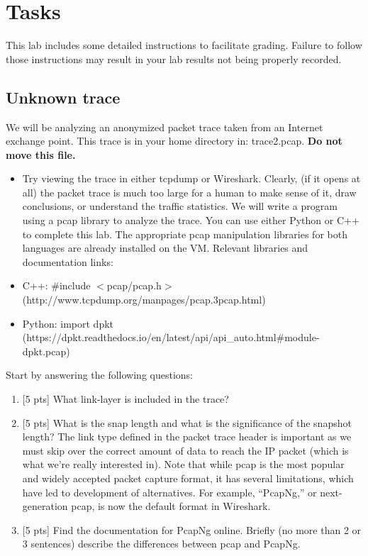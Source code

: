 \section{Tasks}
This lab includes some detailed instructions to facilitate grading.  Failure to follow those instructions may result in your
lab results not being properly recorded.
\subsection{Unknown trace}
We will be analyzing an anonymized packet trace taken from an Internet exchange point.  This trace is
in your home directory in: trace2.pcap.  \textbf{Do not move this file.}
\begin{itemize}
\item Try viewing the trace in either tcpdump or Wireshark.
Clearly, (if it opens at all) the packet trace is much too large for a human to make sense of it, draw conclusions, or understand the traffic statistics. We will write a program using a pcap library to analyze the trace. You can use either Python or C++ to complete this lab. The appropriate pcap manipulation libraries for both languages are already installed on the VM.
Relevant libraries and documentation links:
\item C++: \#include $<$pcap/pcap.h$>$ (http://www.tcpdump.org/manpages/pcap.3pcap.html)
\item Python: import dpkt (https://dpkt.readthedocs.io/en/latest/api/api\_auto.html\#module-dpkt.pcap)
\end{itemize}

Start by answering the following questions:
\begin{enumerate}
\item{[5 pts]} What link-layer is included in the trace?
\item {[5 pts]} What is the snap length and what is the significance of the snapshot length?
The link type defined in the packet trace header is important as we must skip over the correct amount of data to reach the IP packet (which is what we’re really interested in).
Note that while pcap is the most popular and widely accepted packet capture format, it has several limitations, which have led to development of
alternatives. For example, “PcapNg,” or next-generation pcap, is now the default format in Wireshark.
\item {[5 pts]} Find the documentation for PcapNg online. Briefly (no more than 2 or 3 sentences) describe the differences between pcap and PcapNg.
\end{enumerate}

